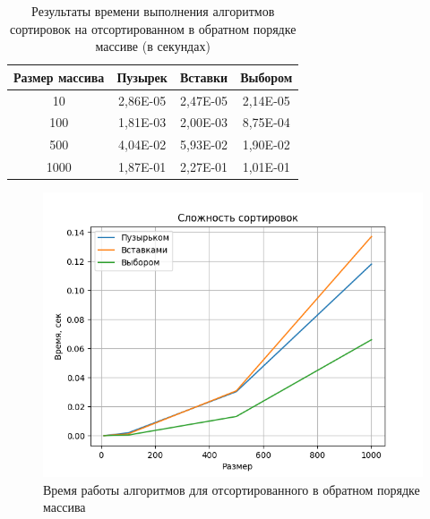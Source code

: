 \documentclass[14pt,russian]{scrartcl}
\begin{document}
\clearpage

  \begin{table}[hts]
        \caption{\centering Результаты времени выполнения алгоритмов сортировок на отсортированном в обратном порядке массиве (в секундах)}
        \centering
        \begin{tabular}{|c|c|c|c|}
        \hline
        Размер массива & Пузырек  & Вставки  & Выбором  \\ \hline
        10             & 2,86E-05 & 2,47E-05 & 2,14E-05 \\ \hline
        100            & 1,81E-03 & 2,00E-03 & 8,75E-04 \\ \hline
        500            & 4,04E-02 & 5,93E-02 & 1,90E-02 \\ \hline
        1000           & 1,87E-01 & 2,27E-01 & 1,01E-01 \\ \hline
        \end{tabular}
        \label{tab:unsorted_bench}
    \end{table}

    \begin{figure}[hts]
	\centering
	\includegraphics[scale = 1]{back_sorted.png}
	\caption{Время работы алгоритмов для отсортированного в обратном порядке массива}
	\label{fig:plot_backwards}
\end{figure}

\clearpage
\end{document}
